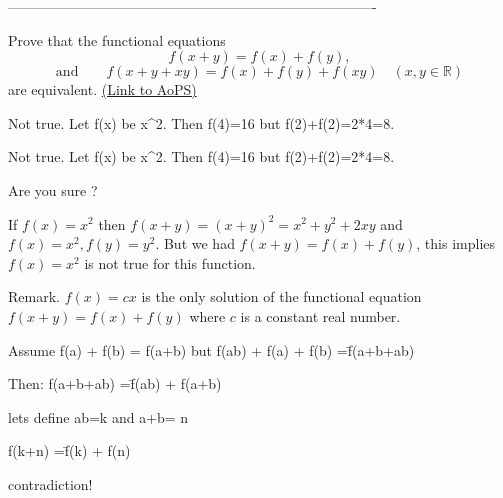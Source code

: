 -------------------------------------------------------------------------------

\begin{problem}
	Prove that the functional equations
\[f(x + y) = f(x) + f(y),\]
\[ \text{and} \qquad  f(x + y + xy) = f(x) + f(y) + f(xy) \quad (x, y \in \mathbb R)\]
are equivalent.
	\flushright \href{https://artofproblemsolving.com/community/c4h366996}{(Link to AoPS)}
\end{problem}



\begin{solution}
	Not true. Let f(x) be x^2. Then f(4)=16 but f(2)+f(2)=2*4=8.
\end{solution}



\begin{solution}
	\begin{tcolorbox}Not true. Let f(x) be x^2. Then f(4)=16 but f(2)+f(2)=2*4=8.\end{tcolorbox}


Are you sure ?

If $f(x)=x^2$ then $f(x+y)=(x+y)^2=x^2+y^2+2xy$ and $f(x)=x^2, f(y)=y^2.$ But we had $f(x+y)=f(x)+f(y)$, this implies $f(x) = x^2$ is not true for this function.

Remark. $f(x)=cx$ is the only solution of the functional equation $f(x+y)=f(x)+f(y)$ where $c$ is a constant real number.
\end{solution}



\begin{solution}
	Assume f(a) + f(b) = f(a+b) but f(ab) + f(a) + f(b) =\= f(a+b+ab)

Then:
 f(a+b+ab)  =\= f(ab) + f(a+b)

lets define ab=k and a+b= n

f(k+n) =\= f(k) + f(n)

contradiction!
\end{solution}



